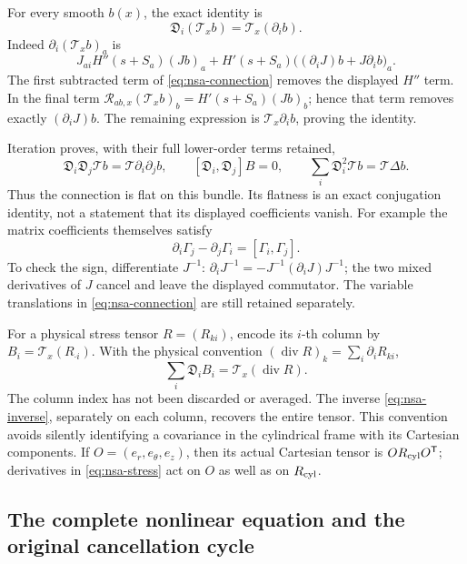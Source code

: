 For every smooth \(b(x)\), the exact identity is
\begin{equation}\label{eq:nsa-intertwine}
 \mathfrak D_i(\mathcal T_xb)=\mathcal T_x(\partial_i b).
\end{equation}
Indeed \(\partial_i(\mathcal T_xb)_a\) is
\[
 J_{ai}H''(s+S_a)(Jb)_a+
 H'(s+S_a)\bigl((\partial_iJ)b+J\partial_i b\bigr)_a .
\]
The first subtracted term of \eqref{eq:nsa-connection} removes
the displayed \(H''\) term. In the final term
\(\mathcal R_{ab,x}(\mathcal T_xb)_b
 =H'(s+S_a)(Jb)_b\); hence that term removes exactly
\((\partial_iJ)b\). The remaining expression is
\(\mathcal T_x\partial_i b\), proving the identity.

Iteration proves, with their full lower-order terms retained,
\[
 \mathfrak D_i\mathfrak D_j\mathcal T b
       =\mathcal T\partial_i\partial_j b,\qquad
 [\mathfrak D_i,\mathfrak D_j]B=0,\qquad
 \sum_i\mathfrak D_i^2\mathcal T b=\mathcal T\Delta b .
\]
Thus the connection is flat on this bundle. Its flatness is an exact
conjugation identity, not a statement that its displayed coefficients
vanish. For example the matrix coefficients themselves satisfy
\[
 \partial_i\Gamma_j-\partial_j\Gamma_i=[\Gamma_i,\Gamma_j].
\]
To check the sign, differentiate \(J^{-1}\):
\(\partial_iJ^{-1}=-J^{-1}(\partial_iJ)J^{-1}\);
the two mixed derivatives of \(J\) cancel and leave the displayed
commutator. The variable translations in
\eqref{eq:nsa-connection} are still retained separately.

For a physical stress tensor \(R=(R_{ki})\), encode its \(i\)-th
column by \(B_i=\mathcal T_x(R_{\cdot i})\). With the physical
convention \((\operatorname{div}R)_k=\sum_i\partial_iR_{ki}\),
\begin{equation}\label{eq:nsa-stress}
 \sum_i\mathfrak D_iB_i=\mathcal T_x(\operatorname{div}R).
\end{equation}
The column index has not been discarded or averaged. The inverse
\eqref{eq:nsa-inverse}, separately on each column, recovers the
entire tensor. This convention avoids silently identifying a
covariance in the cylindrical frame with its Cartesian components.
If \(O=(e_r,e_\theta,e_z)\), then its actual Cartesian tensor is
\(OR_{\rm cyl}O^{\mathsf T}\); derivatives in
\eqref{eq:nsa-stress} act on \(O\) as well as on \(R_{\rm cyl}\).

\subsection{The complete nonlinear equation and the original cancellation cycle}

